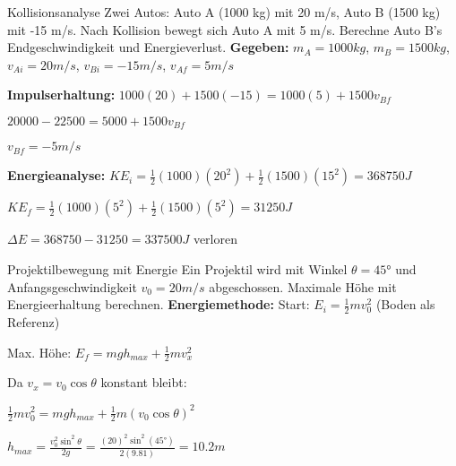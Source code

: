 \begin{example2}{Kollisionsanalyse}
    Zwei Autos: Auto A (1000 kg) mit 20 m/s, Auto B (1500 kg) mit -15 m/s. Nach Kollision bewegt sich Auto A mit 5 m/s. Berechne Auto B's Endgeschwindigkeit und Energieverlust.
    \tcblower
    \textbf{Gegeben:} $m_A = 1000kg$, $m_B = 1500kg$, $v_{Ai} = 20m/s$, $v_{Bi} = -15m/s$, $v_{Af} = 5m/s$
    
    \textbf{Impulserhaltung:}
    $1000(20) + 1500(-15) = 1000(5) + 1500v_{Bf}$
    
    $20000 - 22500 = 5000 + 1500v_{Bf}$
    
    $v_{Bf} = -5m/s$
    
    \textbf{Energieanalyse:}
    $KE_i = \frac{1}{2}(1000)(20^2) + \frac{1}{2}(1500)(15^2) = 368750J$
    
    $KE_f = \frac{1}{2}(1000)(5^2) + \frac{1}{2}(1500)(5^2) = 31250J$
    
    $\Delta E = 368750 - 31250 = 337500J$ verloren
\end{example2}

\begin{example2}{Projektilbewegung mit Energie}
    Ein Projektil wird mit Winkel $\theta = 45°$ und Anfangsgeschwindigkeit $v_0 = 20m/s$ abgeschossen. Maximale Höhe mit Energieerhaltung berechnen.
    \tcblower
    \textbf{Energiemethode:}
    Start: $E_i = \frac{1}{2}mv_0^2$ (Boden als Referenz)
    
    Max. Höhe: $E_f = mgh_{max} + \frac{1}{2}mv_x^2$
    
    Da $v_x = v_0\cos\theta$ konstant bleibt:
    
    $\frac{1}{2}mv_0^2 = mgh_{max} + \frac{1}{2}m(v_0\cos\theta)^2$
    
    $h_{max} = \frac{v_0^2\sin^2\theta}{2g} = \frac{(20)^2\sin^2(45°)}{2(9.81)} = 10.2m$
\end{example2}